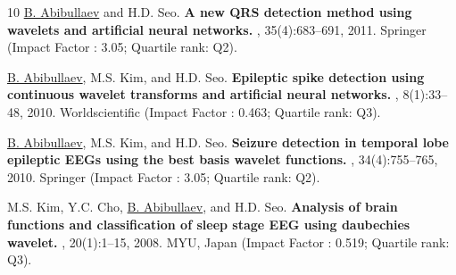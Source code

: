 \documentclass[10pt,letterpaper,sans]{moderncv}   %
\begin{document}
\begin{thebibliography}{10}
    \underline{B. Abibullaev} and H.D. Seo.
    \newblock \textbf{A new {QRS} detection method using wavelets and artificial neural networks.} , 35(4):683--691, 2011. Springer (Impact Factor : 3.05; Quartile rank: Q2).
    
    \underline{B. Abibullaev}, M.S. Kim, and H.D. Seo.
    \newblock \textbf{Epileptic spike detection using continuous wavelet transforms and artificial neural networks.} , 8(1):33--48, 2010.  Worldscientific (Impact Factor : 0.463; Quartile rank: Q3).
    
    \underline{B. Abibullaev}, M.S. Kim, and H.D. Seo.
    \newblock \textbf{Seizure detection in temporal lobe epileptic {EEGs} using the best basis wavelet functions.} , 34(4):755--765, 2010. Springer (Impact Factor : 3.05; Quartile rank: Q2).
    
    M.S. Kim, Y.C. Cho, \underline{B. Abibullaev}, and H.D. Seo.
    \newblock \textbf{Analysis of brain functions and classification of sleep stage {EEG} using daubechies wavelet.} , 20(1):1--15, 2008. MYU, Japan (Impact Factor : 0.519; Quartile rank: Q3).

\end{thebibliography}
\vspace{0.2cm}
\end{document}
